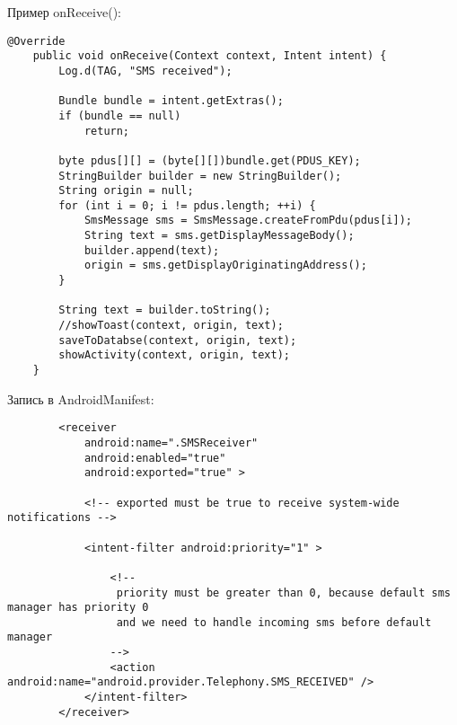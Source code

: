 \documentclass[utf8]{beamer}
\begin{document}
\begin{frame}[fragile]
    Пример onReceive():
    \begin{lstlisting}[basicstyle=\tiny]
@Override
    public void onReceive(Context context, Intent intent) {
        Log.d(TAG, "SMS received");

        Bundle bundle = intent.getExtras();
        if (bundle == null)
            return;

        byte pdus[][] = (byte[][])bundle.get(PDUS_KEY);
        StringBuilder builder = new StringBuilder();
        String origin = null;
        for (int i = 0; i != pdus.length; ++i) {
            SmsMessage sms = SmsMessage.createFromPdu(pdus[i]);
            String text = sms.getDisplayMessageBody();
            builder.append(text);
            origin = sms.getDisplayOriginatingAddress();
        }

        String text = builder.toString();
        //showToast(context, origin, text);
        saveToDatabse(context, origin, text);
        showActivity(context, origin, text);
    }		    
    \end{lstlisting}
\end{frame}
\begin{frame}[fragile]    
    Запись в AndroidManifest:
    \begin{lstlisting}
        <receiver
            android:name=".SMSReceiver"
            android:enabled="true"
            android:exported="true" >

            <!-- exported must be true to receive system-wide notifications -->

            <intent-filter android:priority="1" >

                <!--
                 priority must be greater than 0, because default sms manager has priority 0
                 and we need to handle incoming sms before default manager
                -->
                <action android:name="android.provider.Telephony.SMS_RECEIVED" />
            </intent-filter>
        </receiver>
    \end{lstlisting}		    
\end{frame}
\end{document}
